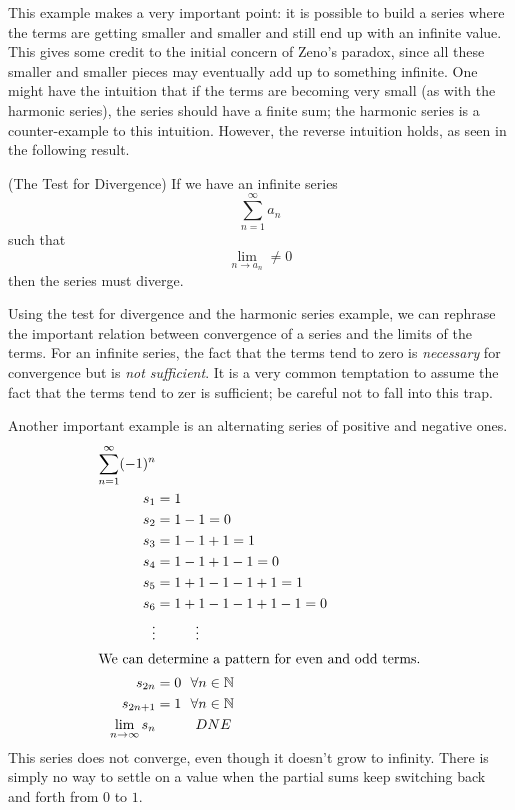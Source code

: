 \documentclass[fleqn,letterpaper]{report}
\begin{document}
This example makes a very important point: it is possible to
build a series where the terms are getting smaller and smaller
and still end up with an infinite value. This gives some
credit to the initial concern of Zeno's paradox, since all
these smaller and smaller pieces may eventually add up to
something infinite. One might have the intuition that if the
terms are becoming very small (as with the harmonic series),
the series should have a finite sum; the harmonic series is a
counter-example to this intuition. However, the reverse
intuition holds, as seen in the following result.

\begin{prop}(The Test for Divergence)
If we have an infinite series
\begin{equation*}
\sum_{n=1}^\infty a_n
\end{equation*}
such that 
\begin{equation*}
\lim_{n \rightarrow a_n} \neq 0
\end{equation*}
then the series must diverge.
\end{prop} 
Using the test for divergence and the harmonic series example,
we can rephrase the important relation between convergence of
a series and the limits of the terms. For an infinite series,
the fact that the terms tend to zero is \emph{necessary} for
convergence but is \emph{not sufficient}. It is a very common
temptation to assume the fact that the terms tend to zer is
sufficient; be careful not to fall into this trap.

\begin{example}Another important example is an alternating
series of positive and negative ones.
\begin{align*}
\sum_{n=1}^\infty (-1)^n & \\
s_1 & = 1 \\
s_2 & = 1-1 = 0 \\
s_3 & = 1-1+1 = 1\\
s_4 & = 1-1+1-1 = 0 \\
s_5 & = 1+1-1-1+1 = 1\\
s_6 & = 1+1-1-1+1-1 = 0 \\
\vdots & \hspace{1cm} \vdots \\
\intertext{We can determine a pattern for even and odd terms.}
s_{2n} & = 0 \ \ \forall n \in \mathbb{N}\\
s_{2n+1} & = 1 \ \ \forall n \in \mathbb{N} \\
\lim_{n \rightarrow \infty} s_n & \hspace{1cm} DNE
\end{align*}
This series does not converge, even though it doesn't grow to
infinity. There is simply no way to settle on a value when the
partial sums keep switching back and forth from $0$ to $1$. 
\end{example}
\end{document}
